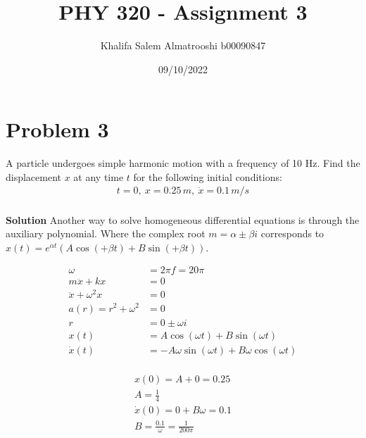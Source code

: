 \documentclass[]{article}
\title{PHY 320 - Assignment 3}
\author{Khalifa Salem Almatrooshi b00090847}
\date{09/10/2022}
\newcommand{\bd}{\textbf}
\begin{document}
	
	\maketitle
	
	\section{Problem 3}
	
	A particle undergoes simple harmonic motion with a frequency of 10 Hz. Find the displacement $ x $ at any time $ t $ for the following initial conditions: 
	\begin{equation}
		\begin{split}
			t = 0, \ x = 0.25 \, \si{m}, \ \dot{x} = 0.1 \, \si{m/s} \\
		\end{split}
	\end{equation}

	\bd{Solution} Another way to solve homogeneous differential equations is through the auxiliary polynomial. Where the complex root $ m = \alpha \pm \beta i $ corresponds to $ x(t) = e^{\alpha t}\left( A\cos(+\beta t) + B\sin(+\beta t) \right) $.
	
	\begin{equation}
		\begin{split}
			\omega &= 2\pi f = 20\pi \\
			m\ddot{x} + kx &= 0 \\
			\ddot{x} + \omega^2 x &= 0 \\
			a(r) = r^2 + \omega^2 &= 0 \\
			r &= 0 \pm \omega i \\
			x(t) &= A\cos(\omega t) + B\sin(\omega t) \\
			\dot{x}(t) &= -A \omega \sin(\omega t) + B \omega \cos(\omega t) \\
		\end{split}
	\end{equation}

	\begin{equation}
		\begin{split}
			x(0) = A + 0 = 0.25 \\
			A = \frac{1}{4} \\
			\dot{x}(0) = 0 + B\omega = 0.1 \\
			B = \frac{0.1}{\omega} = \frac{1}{200\pi} \\
		\end{split}
	\end{equation}
\end{document}
